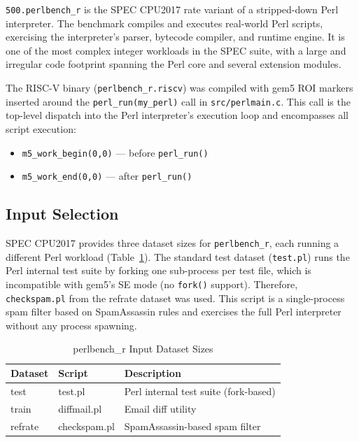 \documentclass[conference]{IEEEtran}
\begin{document}
\texttt{500.perlbench\_r} is the SPEC CPU2017 rate variant of a
stripped-down Perl interpreter. The benchmark compiles and executes
real-world Perl scripts, exercising the interpreter's parser, bytecode
compiler, and runtime engine. It is one of the most complex integer
workloads in the SPEC suite, with a large and irregular code footprint
spanning the Perl core and several extension modules.

The RISC-V binary (\texttt{perlbench\_r.riscv}) was compiled with gem5
ROI markers inserted around the \texttt{perl\_run(my\_perl)} call in
\texttt{src/perlmain.c}. This call is the top-level dispatch into the
Perl interpreter's execution loop and encompasses all script execution:

\begin{itemize}
    \item \texttt{m5\_work\_begin(0,0)} --- before \texttt{perl\_run()}
    \item \texttt{m5\_work\_end(0,0)}   --- after  \texttt{perl\_run()}
\end{itemize}

\subsection{Input Selection}

SPEC CPU2017 provides three dataset sizes for \texttt{perlbench\_r},
each running a different Perl workload (Table~\ref{tab:inputs}).
The standard test dataset (\texttt{test.pl}) runs the Perl internal
test suite by forking one sub-process per test file, which is
incompatible with gem5's SE mode (no \texttt{fork()} support).
Therefore, \texttt{checkspam.pl} from the refrate dataset was used.
This script is a single-process spam filter based on SpamAssassin
rules and exercises the full Perl interpreter without any
process spawning.

\begin{table}[H]
\centering
\caption{perlbench\_r Input Dataset Sizes}
\label{tab:inputs}
\begin{tabular}{lll}
\toprule
\textbf{Dataset} & \textbf{Script} & \textbf{Description} \\
\midrule
test    & test.pl      & Perl internal test suite (fork-based) \\
train   & diffmail.pl  & Email diff utility \\
refrate & checkspam.pl & SpamAssassin-based spam filter \\
\bottomrule
\end{tabular}
\end{table}
\end{document}
